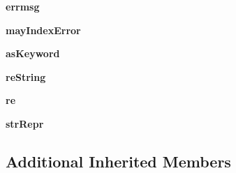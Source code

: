 \begin{DoxyCompactItemize}
{\bfseries errmsg}
\item 
\mbox{\label{classpkg__resources_1_1__vendor_1_1pyparsing_1_1_word_a9e9945a19e053e229a84970ba8883c11}} 
{\bfseries may\+Index\+Error}
\item 
\mbox{\label{classpkg__resources_1_1__vendor_1_1pyparsing_1_1_word_ae25914c020a5278f45324d90e776c6e8}} 
{\bfseries as\+Keyword}
\item 
\mbox{\label{classpkg__resources_1_1__vendor_1_1pyparsing_1_1_word_aea5fdb30360780bfcde0c0aa14655491}} 
{\bfseries re\+String}
\item 
\mbox{\label{classpkg__resources_1_1__vendor_1_1pyparsing_1_1_word_a327ed993cdd9e2091a145db6501df4ec}} 
{\bfseries re}
\item 
\mbox{\label{classpkg__resources_1_1__vendor_1_1pyparsing_1_1_word_a079c355183815cadc9ee98f2d113d867}} 
{\bfseries str\+Repr}
\end{DoxyCompactItemize}
\subsection*{Additional Inherited Members}


